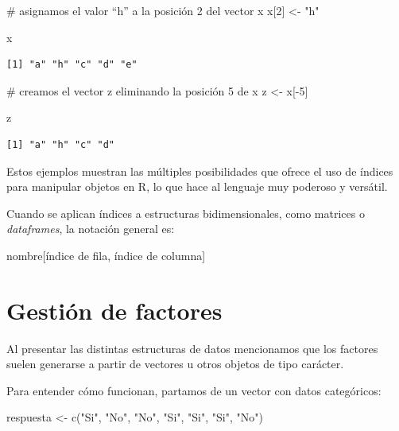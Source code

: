 \documentclass[
  spanish,
  letterpaper,
  DIV=11,
  numbers=noendperiod]{scrreprt}
\newenvironment{Shaded}{\begin{snugshade}}{\end{snugshade}}
\newcommand{\CommentTok}[1]{\textcolor[rgb]{0.37,0.37,0.37}{#1}}
\newcommand{\DecValTok}[1]{\textcolor[rgb]{0.68,0.00,0.00}{#1}}
\newcommand{\FunctionTok}[1]{\textcolor[rgb]{0.28,0.35,0.67}{#1}}
\newcommand{\NormalTok}[1]{\textcolor[rgb]{0.00,0.23,0.31}{#1}}
\newcommand{\OtherTok}[1]{\textcolor[rgb]{0.00,0.23,0.31}{#1}}
\newcommand{\SpecialCharTok}[1]{\textcolor[rgb]{0.37,0.37,0.37}{#1}}
\newcommand{\StringTok}[1]{\textcolor[rgb]{0.13,0.47,0.30}{#1}}
\begin{document}
\begin{Shaded}
\begin{Highlighting}[]
\CommentTok{\# asignamos el valor “h” a la posición 2 del vector x}
\NormalTok{x[}\DecValTok{2}\NormalTok{] }\OtherTok{\textless{}{-}} \StringTok{"h"}

\NormalTok{x}
\end{Highlighting}
\end{Shaded}

\begin{verbatim}
[1] "a" "h" "c" "d" "e"
\end{verbatim}

\begin{Shaded}
\begin{Highlighting}[]
\CommentTok{\# creamos el vector z eliminando la posición 5 de x}
\NormalTok{z }\OtherTok{\textless{}{-}}\NormalTok{ x[}\SpecialCharTok{{-}}\DecValTok{5}\NormalTok{]}

\NormalTok{z}
\end{Highlighting}
\end{Shaded}

\begin{verbatim}
[1] "a" "h" "c" "d"
\end{verbatim}

Estos ejemplos muestran las múltiples posibilidades que ofrece el uso de
índices para manipular objetos en R, lo que hace al lenguaje muy
poderoso y versátil.

Cuando se aplican índices a estructuras bidimensionales, como matrices o
\emph{dataframes}, la notación general es:

\begin{Shaded}
\begin{Highlighting}[]
\NormalTok{nombre[índice de fila, índice de columna]}
\end{Highlighting}
\end{Shaded}

\section{Gestión de factores}\label{gestiuxf3n-de-factores}

Al presentar las distintas estructuras de datos mencionamos que los
factores suelen generarse a partir de vectores u otros objetos de tipo
carácter.

Para entender cómo funcionan, partamos de un vector con datos
categóricos:

\begin{Shaded}
\begin{Highlighting}[]
\NormalTok{respuesta }\OtherTok{\textless{}{-}} \FunctionTok{c}\NormalTok{(}\StringTok{"Si"}\NormalTok{, }\StringTok{"No"}\NormalTok{, }\StringTok{"No"}\NormalTok{, }\StringTok{"Si"}\NormalTok{, }\StringTok{"Si"}\NormalTok{, }\StringTok{"Si"}\NormalTok{, }\StringTok{"No"}\NormalTok{)}
\end{Highlighting}
\end{Shaded}
\end{document}

